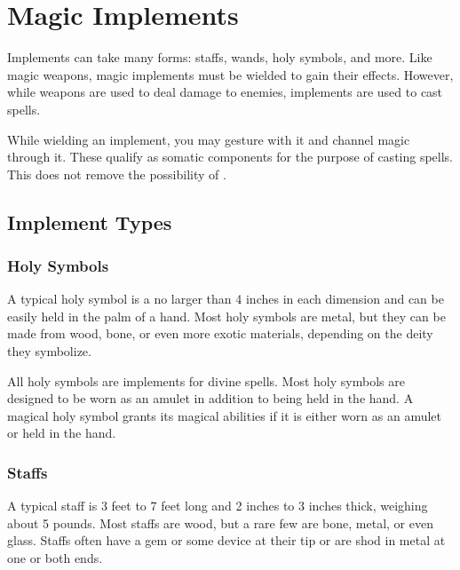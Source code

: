         

        

\section{Magic Implements}\label{Implements}

    Implements can take many forms: staffs, wands, holy symbols, and more.
    Like magic weapons, magic implements must be wielded to gain their effects.
    However, while weapons are used to deal damage to enemies, implements are used to cast spells.

     While wielding an implement, you may gesture with it and channel magic through it.
    These qualify as somatic components for the purpose of casting spells.
    This does not remove the possibility of .

    \subsection{Implement Types}

        \subsubsection{Holy Symbols}

             A typical holy symbol is a no larger than 4 inches in each dimension and can be easily held in the palm of a hand.
            Most holy symbols are metal, but they can be made from wood, bone, or even more exotic materials, depending on the deity they symbolize.

             All holy symbols are implements for divine spells.
            Most holy symbols are designed to be worn as an amulet in addition to being held in the hand.
            A magical holy symbol grants its magical abilities if it is either worn as an amulet or held in the hand.

        \subsubsection{Staffs}

             A typical staff is 3 feet to 7 feet long and 2 inches to 3 inches thick, weighing about 5 pounds.
            Most staffs are wood, but a rare few are bone, metal, or even glass.
            Staffs often have a gem or some device at their tip or are shod in metal at one or both ends.

